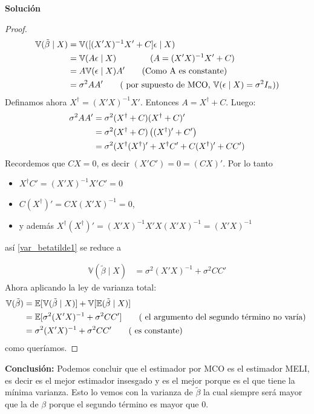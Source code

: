 \documentclass[a4paper, answers, addpoints, 11pt]{exam}
\newenvironment{solucion}{%
  \begin{mdframed}[
    backgroundcolor=blue!5,    %
    linecolor=blue!50,          %
    linewidth=2pt,              %
    leftmargin=10pt,            %
    rightmargin=8pt,           %
    topline=true,              %
    bottomline=true,            %
    roundcorner=10pt,           %
    innerleftmargin=10pt,       %
    innerrightmargin=10pt,      %
    innerbottommargin=10pt,     %
    innertopmargin=10pt         %
  ]%
  \begin{tcolorbox}[colframe=blue!50!black, colback=blue!50, coltitle=white, sharp corners=all, boxrule=1mm, width=\textwidth, halign=left, valign=center, top=0mm, bottom=0mm, left=0mm, right=0mm] \textbf{Solución} \end{tcolorbox} }{\end{mdframed}}
\begin{document}
\begin{solucion}
\begin{proof}
\begin{align}
   \mathbb{V}(\tilde{\beta} \mid X) &= \mathbb{V}([(X'X)^{-1}X'+C]\epsilon \mid X)  \notag \\
    &= \mathbb{V}(A\epsilon \mid X) \qquad \qquad (A=(X'X)^{-1}X'+C)
   \notag \\
    &= A\mathbb{V}(\epsilon \mid X)A' \qquad ( \text{Como A es constante)  }\notag \\
    &= \sigma^2 AA' \qquad (\text{ por supuesto de MCO, }  \mathbb{V}(\epsilon \mid X)=\sigma^2I_n) ) \notag 
    \end{align}
    Definamos ahora $ X^\dagger=(X'X)^{-1}X'$. Entonces $A=X^\dagger+C$. Luego:
    \begin{align}
    \sigma^2 AA' &=\sigma^2(X^\dagger+C )(X^\dagger+C)' \notag \\
    &= \sigma^2(X^\dagger+C )\left((X^\dagger)'   +C'\right) \notag \\
    &= \sigma^2(X^\dagger(X^\dagger)' + X^\dagger C' + C(X^\dagger)' + CC'  ) \label{var_betatilde1}
   \end{align}
   Recordemos que $CX=0$, es decir $(X'C')=0 = (CX)'$. Por lo tanto 
   \begin{itemize}
       \item $X^\dagger C'= (X'X)^{-1}X'C'=0$
       \item $C(X^\dagger)'=CX(X'X)^{-1}=0$,
       \item y además $X^\dagger(X^\dagger)'=(X'X)^{-1}X'X(X'X)^{-1}=(X'X)^{-1}$
   \end{itemize}
   así \ref{var_betatilde1} se reduce a 

   \begin{align*}
       \mathbb{V}(\tilde{\beta} \mid X) &= \sigma^2(X'X)^{-1} + \sigma^2CC'
   \end{align*}
   Ahora aplicando la ley de varianza total:
   \begin{align}
   \mathbb{V}(\tilde{\beta}) &= \mathbb{E}[\mathbb{V}(\tilde{\beta} \mid X)] + \mathbb{V}[\mathbb{E}(\tilde{\beta} \mid X)]  \notag \\
   &= \mathbb{E}[\sigma^2(X'X)^{-1} + \sigma^2CC'] \qquad (\text{ el argumento del segundo término no varía) } \notag \\
    &= \sigma^2(X'X)^{-1} + \sigma^2CC' \qquad (\text{ es constante) }
   \label{law_total_variance}
\end{align}
como queríamos.
\end{proof}

\textbf{Conclusión:}
Podemos concluir que el estimador por MCO es el estimador MELI, es decir es el mejor estimador insesgado y es el mejor porque es el que tiene la mínima varianza. Esto lo vemos con la varianza de $\tilde{\beta}$  la cual siempre será mayor que la de $\beta$ porque el segundo término es mayor que 0.


\end{solucion}
\end{document}
